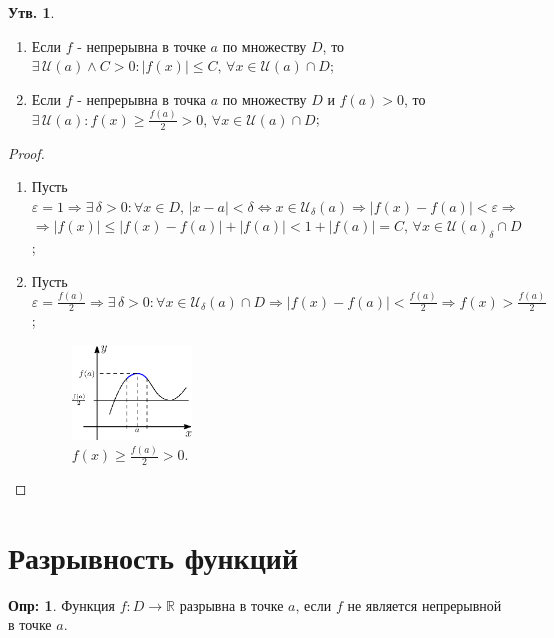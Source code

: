 \documentclass[12pt]{article}
\theoremstyle{definition}
\newtheorem{defn}{Опр:}
\newtheorem{prop}{Утв.}
\begin{document}
\begin{prop}\hfill
	\begin{enumerate}[label={(\arabic*)}]
		\item Если $f$ - непрерывна в точке $a$ по множеству $D$, то $\exists \, \mathcal{U}(a) \wedge C > 0 \colon |f(x)| \leq  C, \, \forall x \in \mathcal{U}(a) \cap D$;
		\item Если $f$ - непрерывна в точка $a$ по множеству $D$ и $f(a) >0$, то $\exists \, \mathcal{U}(a) \colon f(x) \geq \frac{f(a)}{2} > 0, \, \forall x \in \mathcal{U}(a) \cap D$;
	\end{enumerate}
\end{prop}

\begin{proof}\hfill
	\begin{enumerate}[label={(\arabic*)}]
		\item Пусть $\varepsilon = 1 \Rightarrow \exists \, \delta > 0 \colon \forall x \in D, \, |x - a|< \delta \Leftrightarrow x \in \mathcal{U}_\delta (a) \Rightarrow |f(x) - f(a)| < \varepsilon \Rightarrow$\\
		$\Rightarrow |f(x)| \leq |f(x) - f(a)| + |f(a)| < 1 + |f(a)| = C, \, \forall x \in \mathcal{U}(a)_\delta \cap D$;
		\item Пусть $\varepsilon = \frac{f(a)}{2} \Rightarrow \exists \, \delta > 0 \colon \forall x \in \mathcal{U}_\delta(a)\cap D \Rightarrow |f(x) - f(a)| < \frac{f(a)}{2} \Rightarrow f(x) > \frac{f(a)}{2}$;
		\begin{figure}[H]
			\centering
			\includegraphics[width=0.3\textwidth]{17_1.eps}
			\caption{ $f(x) \geq \frac{f(a)}{2} > 0$.}
			\label{17_1}
		\end{figure}
	\end{enumerate}
\end{proof}

\newpage

\section*{Разрывность функций}

\begin{defn}
	Функция $f \colon D \to \mathbb{R}$ разрывна в точке $a$, если $f$ не является непрерывной в точке $a$.
\end{defn}
\end{document}
